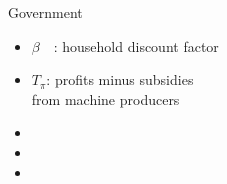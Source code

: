 \documentclass[11pt,aspectratio=169]{beamer}
\begin{document}
\begin{frame}{ Government}
			\small
			\vspace{0mm}
			\hspace{-10mm}
			\begin{minipage}[t!]{0.5\textwidth}
				\vspace{7mm}
				\begin{itemize}
					\item[] $\beta$\ \ : household discount factor\vspace{-2mm}
					\item[] $T_\pi$: profits minus subsidies \\ \hspace{5.5mm} from machine producers \vspace{0mm}
				\end{itemize}
			\end{minipage}
			\begin{minipage}[t!]{0.4\textwidth}
				\vspace{8mm}
				\begin{itemize}
					\item[] %
					\vspace{-2mm}	
					\item[] %
					\item[] %
				\end{itemize}
			\end{minipage}
		\end{frame}
		
		\addtocounter{framenumber}{-1}
		
\end{document}
